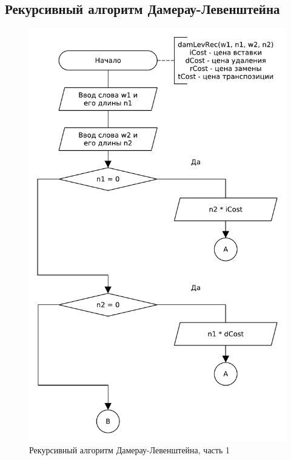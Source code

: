 \subsection{Рекурсивный алгоритм Дамерау-Левенштейна}
\begin{figure}[H]
    \centering
    \includegraphics[scale=0.8]{pdf/damerau-levenshteainrec-part1.pdf}
    \caption{Рекурсивный алгоритм Дамерау-Левенштейна, часть 1}
\end{figure}

